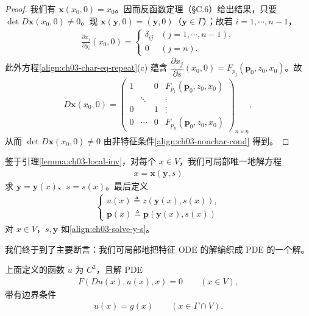 \documentclass[../../main.tex]{subfiles}
\begin{document}
\begin{proof}
我们有 $\mathbf{x}(x_0,0)=x_0$。因而反函数定理（\S C.6）给出结果，只要 $\det D\mathbf{x}(x_0,0)\neq 0$。现 $\mathbf{x}(\mathbf{y},0)=(\mathbf{y},0)$（$\mathbf{y}\in\Gamma$）；故若 $i=1,\cdots,n-1$，
\begin{align*}
\frac{\partial x_j}{\partial y_i}(x_0,0)=
\begin{cases}
\delta_{ij} & (j=1,\cdots,n-1),\\
0 & (j=n).
\end{cases}
\end{align*}
此外方程\eqref{align:ch03-char-eq-repeat}(c) 蕴含 $\dfrac{\partial x_j}{\partial s}(x_0,0)=F_{p_j}(\mathbf{p}_0,z_0,x_0)$。故
\begin{align*}
D\mathbf{x}(x_0,0)=
\begin{pmatrix}
1 & & 0 & F_{p_1}(\mathbf{p}_0,z_0,x_0)\\
& \ddots & & \vdots\\
0 & & 1 & \vdots\\
0 & \cdots & 0 & F_{p_n}(\mathbf{p}_0,z_0,x_0)
\end{pmatrix}_{n\times n},
\end{align*}
从而 $\det D\mathbf{x}(x_0,0)\neq 0$ 由非特征条件\eqref{align:ch03-nonchar-cond} 得到。
\end{proof}

鉴于引理\cref{lemma:ch03-local-inv}，对每个 $x\in V$，我们可局部唯一地解方程
\begin{align}\label{align:ch03-solve-y-s}
x=\mathbf{x}(\mathbf{y},s)
\end{align}
求 $\mathbf{y}=\mathbf{y}(x)$、$s=s(x)$。最后定义
\begin{align}\label{align:ch03-define-u-p}
\begin{cases}
u(x)\triangleq z(\mathbf{y}(x),s(x)),\\
\mathbf{p}(x)\triangleq\mathbf{p}(\mathbf{y}(x),s(x))
\end{cases}
\end{align}
对 $x\in V$，$s,\mathbf{y}$ 如\eqref{align:ch03-solve-y-s}。

我们终于到了主要断言：我们可局部地把特征 ODE 的解编织成 PDE 的一个解。

\begin{theorem}[局部存在定理]\label{theorem:ch03-local-existence}上面定义的函数 $u$ 为 $C^2$，且解 PDE
\begin{align*}
F(Du(x),u(x),x)=0 \qquad (x\in V),
\end{align*}
带有边界条件
\begin{align*}
u(x)=g(x) \qquad (x\in\Gamma\cap V).
\end{align*}
\end{theorem}
\end{document}
